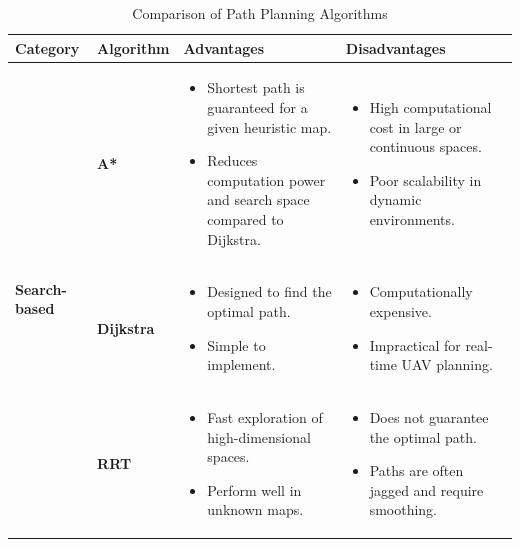 \documentclass[12pt, a4paper]{article}
\begin{document}
\begin{table}[ht]
    \centering
    \renewcommand{\arraystretch}{1.3} %
    \begin{tabularx}{\textwidth}{@{} l l X X @{}} 
    \toprule
    \textbf{Category} & \textbf{Algorithm} & \textbf{Advantages} & \textbf{Disadvantages} \\ 
    \midrule

    \multirow{10}{*}{\textbf{Search-based}} & \textbf{A*} & 
    \begin{itemize}[leftmargin=*, noitemsep, topsep=0pt]
        \item Shortest path is guaranteed for a given heuristic map.
        \item Reduces computation power and search space compared to Dijkstra.
    \end{itemize} & 
    \begin{itemize}[leftmargin=*, noitemsep, topsep=0pt]
        \item High computational cost in large or continuous spaces.
        \item Poor scalability in dynamic environments.
    \end{itemize} \\ 
    \cmidrule{2-4}
    
    & \textbf{Dijkstra} & 
    \begin{itemize}[leftmargin=*, noitemsep, topsep=0pt]
        \item Designed to find the optimal path. 
        \item Simple to implement.
    \end{itemize} & 
    \begin{itemize}[leftmargin=*, noitemsep, topsep=0pt]
        \item Computationally expensive.
        \item Impractical for real-time UAV planning.
    \end{itemize} \\ 
    \midrule

    \textbf{Sampling-based} & \textbf{RRT} & 
    \begin{itemize}[leftmargin=*, noitemsep, topsep=0pt]
        \item Fast exploration of high-dimensional spaces.
        \item Perform well in unknown maps.
    \end{itemize} & 
    \begin{itemize}[leftmargin=*, noitemsep, topsep=0pt]
        \item Does not guarantee the optimal path.
        \item Paths are often jagged and require smoothing.
    \end{itemize} \\ 
    \bottomrule
    \end{tabularx}
    \caption{Comparison of Path Planning Algorithms}
    \label{tab:algorithms}
\end{table}
\end{document}
